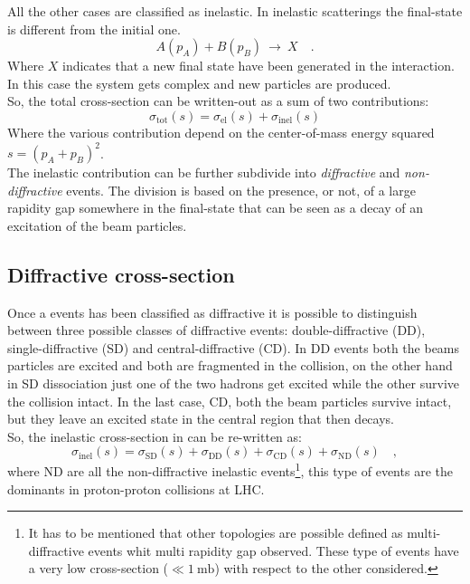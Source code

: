 \noindent All the other cases are classified as inelastic. In inelastic scatterings the final-state is different from the initial one.
\begin{equation}
	A(p_A)+B(p_B)\ \longrightarrow \ X\quad.
\end{equation} 
Where $X$ indicates that a new final state have been generated in the interaction. In this case the system gets complex and new particles are produced. 
\\
So, the total cross-section can be written-out as a sum of two contributions:
\begin{equation}
	\sigma_{\text{tot}}(s) = \sigma_{\text{el}}(s) + \sigma_{\text{inel}}(s)
	\label{eq:cross_section_elastic_inelastic}
\end{equation}
Where the various contribution depend on the center-of-mass energy squared $s=(p_A+p_B)^2$.
\\
The inelastic contribution can be further subdivide into \textit{diffractive} and \textit{non-diffractive} events. The division is based on the presence, or not, of a large rapidity gap somewhere in the final-state that can be seen as a decay of an excitation of the beam particles.

\subsection{Diffractive cross-section} 

Once a events has been classified as diffractive it is possible to distinguish between three possible classes of diffractive events: double-diffractive (DD), single-diffractive (SD) and central-diffractive (CD). 
In DD events both the beams particles are excited and both are fragmented in the collision, on the other hand in SD dissociation just one of the two hadrons get excited while the other survive the collision intact. In the last case, CD, both the beam particles survive intact, but they leave an excited state in the central region that then decays.
\\
So, the inelastic cross-section in  can be re-written as:
\begin{equation}
	\sigma_{\text{inel}}(s) = \sigma_{\text{SD}}(s)+\sigma_{\text{DD}}(s)+\sigma_{\text{CD}}(s)+\sigma_{\text{ND}}(s)  \quad,
\end{equation}
where ND are all the non-diffractive inelastic events\footnote{It has to be mentioned that other topologies are possible defined as multi-diffractive events whit multi rapidity gap observed. These type of events have a very low cross-section ($\ll 1 \ \mathrm{mb}$) with respect to the other considered.}, this type of events are the dominants in proton-proton collisions at LHC.


